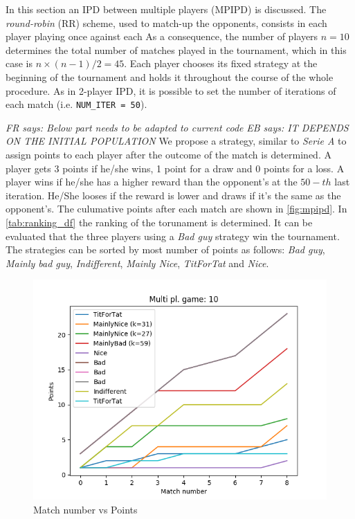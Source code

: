 \documentclass[journal,a4paper,10pt,twoside]{IEEEtran}
\newcommand{\EB}[1]{\textit{\color{blue}EB says: #1}}
\newcommand{\FR}[1]{\textit{\color{ForestGreen}FR says: #1}}
\begin{document}
In this section an IPD between multiple players (MPIPD) is discussed.
The \textit{round-robin} (RR) scheme, used to match-up the opponents, consists in each player playing once against each As a consequence, the number of players $n = 10$ determines the total number of matches played in the tournament, which in this case is ${n \times (n-1)}/{2} = 45$.
Each player chooses its fixed strategy at the beginning of the tournament and holds it throughout the course of the whole procedure.
As in 2-player IPD, it is possible to set the number of iterations of each match (i.e. \texttt{NUM\_ITER = 50}).

\FR{Below part needs to be adapted to current code}
\EB{IT DEPENDS ON THE INITIAL POPULATION}
We propose a strategy, similar to \textit{Serie A} to assign points to each player after the outcome of the match is determined. A player gets 3 points if he/she wins, 1 point for a draw and 0 points for a loss. A player wins if he/she has a higher reward than the opponent's at the $50-th$ last iteration. He/She looses if the reward is lower and draws if it's the same as the opponent's.
The culumative points after each match are shown in \autoref{fig:mpipd}.
In \autoref{tab:ranking_df} the ranking of the torunament is determined. It can be evaluated that the three players using a \textit{Bad guy} strategy win the tournament.
The strategies can be sorted by most number of points as follows: \textit{Bad guy}, \textit{Mainly bad guy}, \textit{Indifferent}, \textit{Mainly Nice}, \textit{TitForTat} and \textit{Nice}.

\begin{figure}[ht]
    \centering
    \includegraphics[width=1\columnwidth]{../img/ipdmp-scores-10.png}
    \caption{Match number vs Points}
    \label{fig:mpipd}
\end{figure}
\end{document}
